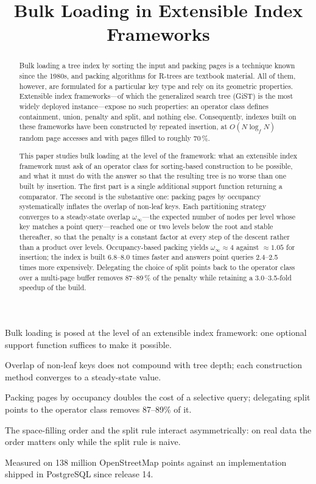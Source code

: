 \documentclass[preprint, 11pt]{elsarticle}
\begin{document}
\begin{frontmatter}

\title{Bulk Loading in Extensible Index Frameworks}

\begin{highlights}
\item Bulk loading is posed at the level of an extensible index framework:
      one optional support function suffices to make it possible.
\item Overlap of non-leaf keys does not compound with tree depth; each
      construction method converges to a steady-state value.
\item Packing pages by occupancy doubles the cost of a selective query;
      delegating split points to the operator class removes 87--89\% of it.
\item The space-filling order and the split rule interact asymmetrically: on
      real data the order matters only while the split rule is naive.
\item Measured on 138 million OpenStreetMap points against an implementation
      shipped in PostgreSQL since release 14.
\end{highlights}

\begin{abstract}
Bulk loading a tree index by sorting the input and packing pages is a technique
known since the 1980s, and packing algorithms for R-trees are textbook
material. All of them, however, are formulated for a particular key type and
rely on its geometric properties. Extensible index frameworks---of which the
generalized search tree (GiST) is the most widely deployed instance---expose no
such properties: an operator class defines containment, union, penalty and
split, and nothing else. Consequently, indexes built on these frameworks have
been constructed by repeated insertion, at $O(N \log_f N)$ random page accesses
and with pages filled to roughly 70\,\%.

This paper studies bulk loading at the level of the framework: what an
extensible index framework must ask of an operator class for sorting-based
construction to be possible, and what it must do with the answer so that the
resulting tree is no worse than one built by insertion. The first part is a
single additional support function returning a comparator. The second is the
substantive one: packing pages by occupancy systematically inflates the overlap
of non-leaf keys. Each partitioning strategy converges to a steady-state
overlap $\omega_\infty$---the expected number of nodes per level whose key
matches a point query---reached one or two levels below the root and stable
thereafter, so that the penalty is a constant factor at every step of the
descent rather than a product over levels. Occupancy-based packing yields
$\omega_\infty \approx 4$ against $\approx 1.05$ for insertion; the index is
built 6.8--8.0 times faster and answers point queries 2.4--2.5 times more
expensively. Delegating the choice of split points back to the operator class
over a multi-page buffer removes 87--89\,\% of the penalty while retaining a
3.0--3.5-fold speedup of the build.


\end{abstract}
\end{frontmatter}
\end{document}
